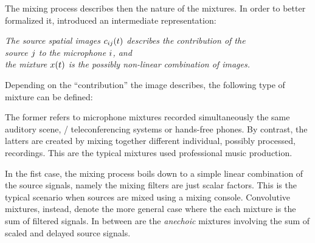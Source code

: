 The mixing process describes then the nature of the mixtures.
In order to better formalized it, \citeauthor{sturmel2012linear} introduced an intermediate representation:
\begin{center}
    \textit{The \emph{source spatial images} $c_{ij}(t)$ describes the contribution of the
    \\source $j$ to the microphone $i$, and
    \\the \emph{mixture} $x(t)$ is the possibly non-linear combination of images.}
\end{center}
Depending on the ``contribution'' the image describes, the following type of mixture can be defined:

The former refers to microphone mixtures recorded simultaneously the same auditory scene, \eg/ teleconferencing systems or hands-free phones.
By contrast, the latters are created by mixing together different individual, possibly processed, recordings.
This are the typical mixtures used professional music production.

In the fist case, the mixing process boils down to a simple linear combination of the source signals, namely
the mixing filters are just scalar factors.
This is the typical scenario when sources are mixed using a mixing console.
Convolutive mixtures, instead, denote the more general case where the each mixture is the sum of filtered signals.
In between are the \textit{anechoic} mixtures involving the sum of scaled and delayed source signals.


